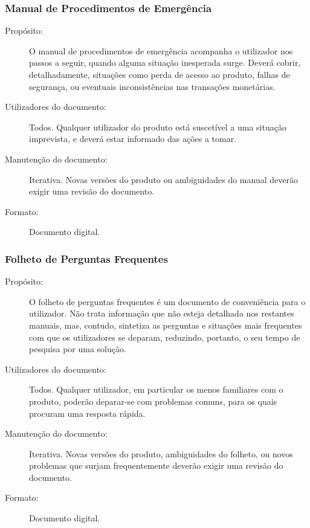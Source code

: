 \documentclass{article}
\begin{document}
    \subsubsection{Manual de Procedimentos de Emergência}
      \begin{description}
        \item[Propósito:]O manual de procedimentos de emergência acompanha o utilizador nos passos a seguir, quando alguma situação inesperada surge. Deverá cobrir, detalhadamente, situações como perda de acesso ao produto, falhas de segurança, ou eventuais inconsistências nas transações monetárias.
        \item[Utilizadores do documento:]Todos. Qualquer utilizador do produto está suscetível a uma situação imprevista, e deverá estar informado das ações a tomar.
        \item[Manutenção do documento:]Iterativa. Novas versões do produto ou ambiguidades do manual deverão exigir uma revisão do documento.
        \item[Formato:]Documento digital.
      \end{description}

    \subsubsection{Folheto de Perguntas Frequentes}
      \begin{description}
        \item[Propósito:]O folheto de perguntas frequentes é um documento de conveniência para o utilizador. Não trata informação que não esteja detalhada nos restantes manuais, mas, contudo, sintetiza as perguntas e situações mais frequentes com que os utilizadores se deparam, reduzindo, portanto, o seu tempo de pesquisa por uma solução.
        \item[Utilizadores do documento:]Todos. Qualquer utilizador, em particular os menos familiares com o produto, poderão deparar-se com problemas comuns, para os quais procuram uma resposta rápida.
        \item[Manutenção do documento:]Iterativa. Novas versões do produto, ambiguidades do folheto, ou novos problemas que surjam frequentemente deverão exigir uma revisão do documento.
        \item[Formato:]Documento digital.
      \end{description}
\end{document}
